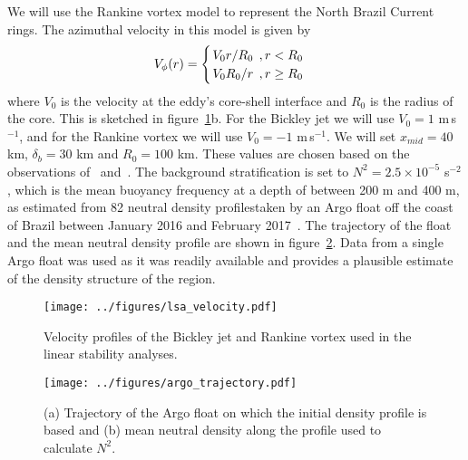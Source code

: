 We will use the Rankine vortex model to represent the North Brazil Current rings. The azimuthal velocity in this model is given by
\begin{equation}
    V_{\phi}(r) = 
    \begin{cases}
        \flatfrac{V_0 r}{R_0} \, , r < R_0 \\
        \flatfrac{V_0 R_0}{r} \, , r \geq R_0
    \end{cases}
\end{equation}
where $V_0$ is the velocity at the eddy's core-shell interface and $R_0$ is the radius of the core. This is sketched in figure~\ref{fig:InitialVelocity}b. For the Bickley jet we will use $V_0 = 1$ m$\,$s$^{-1}$, and for the Rankine vortex we will use $V_0 = - 1$ m$\,$s$^{-1}$. We will set $x_{mid} = 40$ km, $\delta_b = 30$ km and $R_0 = 100$ km. These values are chosen based on the observations of~\citet{Johns1998} and~\citet{Castelao2011}. The background stratification is set to $N^2 = 2.5 \times 10^{-5}$ s$^{-2}$, which is the mean buoyancy frequency at a depth of between 200 m and 400 m, as estimated from 82 neutral density profiles\footnotemark taken by an Argo float off the coast of Brazil between January 2016 and February 2017~\citep{Argo2019}. The trajectory of the float and the mean neutral density profile are shown in figure~\ref{fig:InitialStratification}. Data from a single Argo float was used as it was readily available and provides a plausible estimate of the density structure of the region.

\begin{figure}
    \centering
    \texttt{[image: ../figures/lsa\_velocity.pdf]}
    \caption{Velocity profiles of the Bickley jet and Rankine vortex used in the linear stability analyses.}
    \label{fig:InitialVelocity}
\end{figure}

\begin{figure}
    \centering
    \texttt{[image: ../figures/argo\_trajectory.pdf]}
    \caption{(a) Trajectory of the Argo float on which the initial density profile is based and (b) mean neutral density along the profile used to calculate $N^2$.}
    \label{fig:InitialStratification}
\end{figure}

